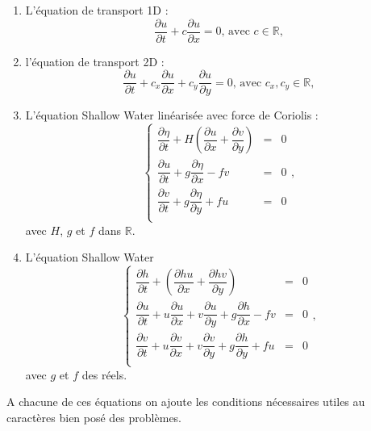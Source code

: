 \begin{enumerate}
\item L'équation de transport 1D :
\begin{equation}
\dfrac{\partial u}{\partial t} + c \dfrac{\partial u}{\partial x} = 0 \text{, avec } c \in \mathbb{R},
\end{equation} 

\item l'équation de transport 2D :
\begin{equation}
\dfrac{\partial u}{\partial t} + c_x \dfrac{\partial u}{\partial x} + c_y \dfrac{\partial u}{\partial y} = 0 \text{, avec } c_x, c_y \in \mathbb{R},
\end{equation} 

\item L'équation Shallow Water linéarisée avec force de Coriolis :
\begin{equation}
\left\lbrace
\begin{array}{rcl}
\dfrac{\partial \eta}{\partial t} + H \left( \dfrac{\partial u}{\partial x} + \dfrac{\partial v}{\partial y} \right) & = & 0 \\
\dfrac{\partial u}{\partial t} + g \dfrac{\partial \eta}{\partial x} - f v & = & 0 \\
\dfrac{\partial v}{\partial t} + g \dfrac{\partial \eta}{\partial y} + f u & = & 0 \\
\end{array}
\right. ,
\end{equation}
avec $H$, $g$ et $f$ dans $\mathbb{R}$.
\item L'équation Shallow Water
\begin{equation}
\left\lbrace
\begin{array}{rcl}
\dfrac{\partial h}{\partial t} + \left( \dfrac{\partial hu}{\partial x} + \dfrac{\partial hv}{\partial y} \right) & = & 0 \\
\dfrac{\partial u}{\partial t} + u \dfrac{\partial u}{\partial x} + v\dfrac{\partial u}{\partial y} + g \dfrac{\partial h}{\partial x} - f v & = & 0 \\
\dfrac{\partial v}{\partial t} + u \dfrac{\partial v}{\partial x} + v\dfrac{\partial v}{\partial y} + g \dfrac{\partial h}{\partial y} + f u & = & 0 \\
\end{array}
\right. ,
\end{equation}
avec
$g$ et $f$ des réels.
\end{enumerate}
A chacune de ces équations on ajoute les conditions nécessaires utiles au caractères bien posé des problèmes.

